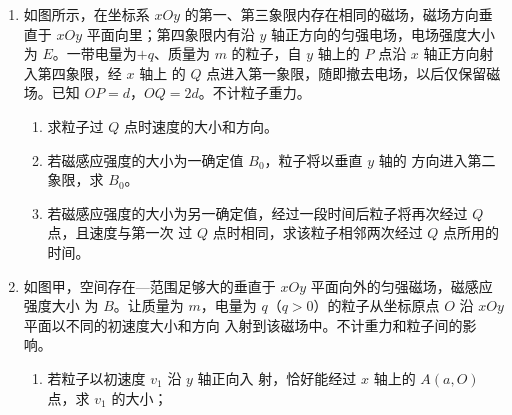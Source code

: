 \begin{enumerate}
\item 
{}
如图所示，在坐标系 $ xOy $ 的第一、第三象限内存在相同的磁场，磁场方向垂直于 $ xOy $
平面向里；第四象限内有沿 $ y $ 轴正方向的匀强电场，电场强度大小为 $ E $。一带电量为$ +q $、质量为 $ m $
的粒子，自 $ y $ 轴上的 $ P $ 点沿 $ x $ 轴正方向射入第四象限，经 $ x $ 轴上
的 $ Q $ 点进入第一象限，随即撤去电场，以后仅保留磁场。已知
$ OP=d $，$ OQ=2d $。不计粒子重力。
\begin{enumerate}
	\item
求粒子过 $ Q $ 点时速度的大小和方向。



\item 
若磁感应强度的大小为一确定值 $ B_{0} $，粒子将以垂直 $ y $ 轴的
方向进入第二象限，求 $ B_{0} $。

\item 
若磁感应强度的大小为另一确定值，经过一段时间后粒子将再次经过 $ Q $ 点，且速度与第一次
过 $ Q $ 点时相同，求该粒子相邻两次经过 $ Q $ 点所用的时间。

	
\end{enumerate}
\begin{figure}[h!]
	\flushright
	
\end{figure}




\item 
{}
如图甲，空间存在—范围足够大的垂直于 $ xOy $ 平面向外的匀强磁场，磁感应强度大小
为 $ B $。让质量为 $ m $，电量为 $ q $（$ q>0 $）的粒子从坐标原点 $ O $ 沿 $ xOy $ 平面以不同的初速度大小和方向
入射到该磁场中。不计重力和粒子间的影响。
\begin{enumerate}
	\item
若粒子以初速度 $ v_{1} $ 沿 $ y $ 轴正向入
射，恰好能经过 $ x $ 轴上的 $ A(a , O) $
点，求 $ v_{1} $ 的大小；


\end{enumerate}
\end{enumerate}
